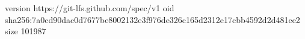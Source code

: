 version https://git-lfs.github.com/spec/v1
oid sha256:7a0cd90dac0d7677be8002132e3f976de326c165d2312e17cbb4592d2d481ee2
size 101987
